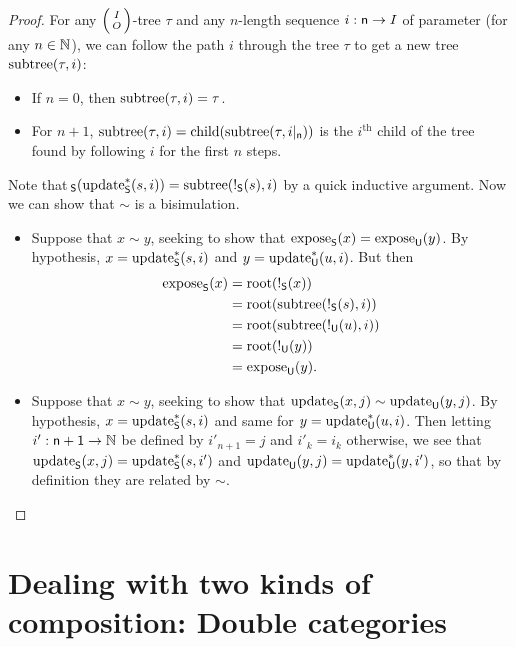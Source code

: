 \documentclass[DynamicalBook]{subfiles}
\begin{document}
\begin{proof}
For any
$\lens{I}{O}$-tree $\tau$ and any $n$-length sequence $i : \mathsf{n} \to I$ of
parameter (for any $n \in \mathbb{N}$), we can follow the path $i$ through the tree
$\tau$ to get a new tree $\mathrm{subtree}(\tau, i)$:
\begin{itemize}
  \item If $n = 0$, then $\mathrm{subtree}(\tau, i) = \tau$.
  \item For $n + 1$, $\mathrm{subtree}(\tau, i) = \mathrm{child}(\mathrm{subtree}(\tau,
    i|_{\mathsf{n}}))$ is the $i^{\text{th}}$ child of the tree found by following
    $i$ for the first $n$ steps.
\end{itemize}
Note that $\!_{\mathsf{S}}(\mathrm{update}_{\mathsf{S}}^{\ast}(s, i)) = \mathrm{subtree}(!_{\mathsf{S}}(s),
i)$ by a quick inductive argument. Now we can show that $\sim$ is a bisimulation.

\begin{itemize}
  \item Suppose that $x \sim y$, seeking to show that $\mathrm{expose}_{\mathsf{S}}(x) =
    \mathrm{expose}_{\mathsf{U}}(y)$. By hypothesis, $x = \mathrm{update}_{\mathsf{S}}^{\ast}(s, i)$ and $y =
    \mathrm{update}_{\mathsf{U}}^{\ast}(u, i)$. But then
    \begin{align*}
      \mathrm{expose}_{\mathsf{S}}(x) &= \mathrm{root}(!_{\mathsf{S}}(x)) \\
                    &= \mathrm{root}(\mathrm{subtree}(!_{\mathsf{S}}(s), i)) \\
      &= \mathrm{root}(\mathrm{subtree}(!_{\mathsf{U}}(u), i)) \\
                    &= \mathrm{root}(!_{\mathsf{U}}(y)) \\
      &= \mathrm{expose}_{\mathsf{U}}(y).
    \end{align*}
  \item Suppose that $x \sim y$, seeking to show that
    $\mathrm{update}_{\mathsf{S}}(x, j) \sim \mathrm{update}_{\mathsf{U}}(y, j)$. By hypothesis, $x =
    \mathrm{update}_{\mathsf{S}}^{\ast}(s, i)$ and same for $y = \mathrm{update}_{\mathsf{U}}^{\ast}(u,i)$. Then
    letting $i' : \mathsf{n+1} \to \mathbb{N}$ be defined by $i'_{n+1} = j$ and $i'_k =
    i_k$ otherwise, we see that $\mathrm{update}_{\mathsf{S}}(x, j) = \mathrm{update}_{\mathsf{S}}^{\ast}(s, i')$
    and $\mathrm{update}_{\mathsf{U}}(y, j) = \mathrm{update}_{\mathsf{U}}^{\ast}(y, i')$, so that by definition
    they are related by $\sim$.
\end{itemize}
\end{proof}

\section{Dealing with two kinds of composition: Double categories}
\end{document}
